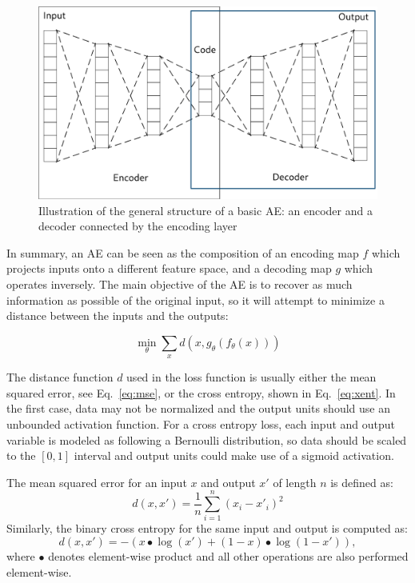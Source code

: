 \documentclass[
	fontsize=11pt, %
	twoside=false, %
	open=any, %
	secnumdepth=1, %
]{kaobook}
\begin{document}
\begin{figure}[ht]
    \centering
    \includegraphics[width=\linewidth]{autoencoder.png}
    \caption{Illustration of the general structure of a basic AE: an encoder and a decoder connected by the encoding layer}
    \label{fig:ae}
\end{figure}

In summary, an AE can be seen as the composition of an encoding map $f$ which projects inputs onto a different feature space, and a decoding map $g$ which operates inversely. The main objective of the AE is to recover as much information as possible of the original input, so it will attempt to minimize a distance between the inputs and the outputs:

\begin{equation}\label{eq:objective}
\min_{\theta} \sum_{x}d(x, g_{\theta}(f_{\theta}(x)))
\end{equation}

The distance function $d$ used in the loss function is usually either the mean squared error, see Eq.~\eqref{eq:mse}, or the cross entropy, shown in  Eq.~\eqref{eq:xent}. In the first case, data may not be normalized and the output units should use an unbounded activation function. For a cross entropy loss, each input and output variable is modeled as following a Bernoulli distribution, so data should be scaled to the $[0,1]$ interval and output units could make use of a sigmoid activation.

The mean squared error for an input $x$ and output $x'$ of length $n$ is defined as:
\begin{equation}\label{eq:mse}
    d(x, x') = \frac 1 n\sum_{i=1}^n(x_i - x'_i)^2
\end{equation}
Similarly, the binary cross entropy for the same input and output is computed as:
\begin{equation}\label{eq:xent}
    d(x, x') = - (x \bullet \log(x') + (1-x)\bullet \log(1-x')),
\end{equation}
where $\bullet$ denotes element-wise product and all other operations are also performed element-wise.
\end{document}
